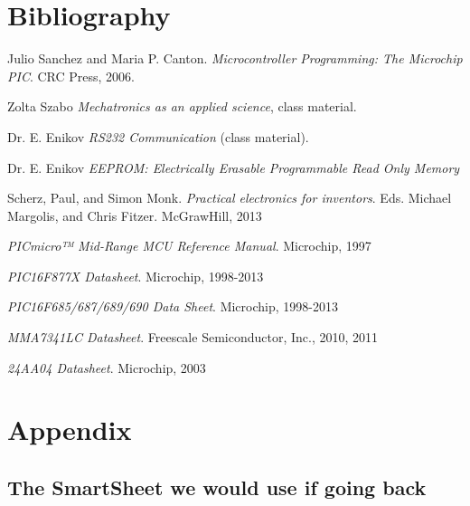 \documentclass[12pt]{article}
\begin{document}
\newpage
\section{Bibliography}

	\begin{thebibliography}{9}
	Julio Sanchez and Maria P. Canton.
	\textit{Microcontroller Programming: The Microchip PIC}. 
	CRC Press, 2006.
	 
	Zolta Szabo 
	\textit{Mechatronics as an applied science}, class material.
	 
	Dr. E. Enikov
	\textit{RS232 Communication} (class material).

	Dr. E. Enikov
	\textit{EEPROM: Electrically Erasable Programmable Read Only Memory}

	Scherz, Paul, and Simon Monk. 
	\textit{Practical electronics for inventors}.
	Eds. Michael Margolis, and Chris Fitzer. McGrawHill, 2013

	\textit{PICmicro™ Mid-Range MCU Reference Manual}.
	Microchip, 1997

	\textit{PIC16F877X Datasheet}.
	Microchip, 1998-2013

	\textit{PIC16F685/687/689/690 Data Sheet}.
	Microchip, 1998-2013

	\textit{MMA7341LC Datasheet}.
	Freescale Semiconductor, Inc., 2010, 2011

	\textit{24AA04 Datasheet}.
	Microchip, 2003
	\end{thebibliography}

\newpage
\section{Appendix}

	\subsection{The SmartSheet we would use if going back}
		\newpage
		\newpage
		\newpage
		\newpage
		\newpage
		\restoregeometry
	\newpage
\end{document}
